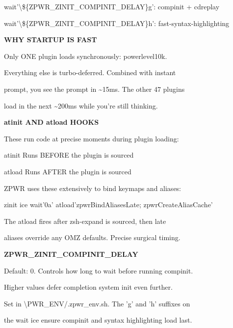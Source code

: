 \documentclass[11pt,a4paper,twoside]{book}
\begin{document}
wait'\textbackslash{}\$\{ZPWR\_ZINIT\_COMPINIT\_DELAY\}g':  compinit + cdreplay

wait'\textbackslash{}\$\{ZPWR\_ZINIT\_COMPINIT\_DELAY\}h':  fast-syntax-highlighting


\vspace{12pt}
{\bfseries\color{neonyellow} WHY STARTUP IS FAST}\vspace{4pt}

Only ONE plugin loads synchronously: powerlevel10k.

Everything else is turbo-deferred. Combined with instant

prompt, you see the prompt in \textasciitilde{}15ms. The other 47 plugins

load in the next \textasciitilde{}200ms while you're still thinking.


\vspace{12pt}
{\bfseries\color{neonyellow} atinit AND atload HOOKS}\vspace{4pt}

These run code at precise moments during plugin loading:

atinit   Runs BEFORE the plugin is sourced

atload   Runs AFTER the plugin is sourced

ZPWR uses these extensively to bind keymaps and aliases:

\begin{codebox}
zinit ice wait'0a' atload'zpwrBindAliasesLate; zpwrCreateAliasCache'\\
\end{codebox}

The atload fires after zsh-expand is sourced, then late

aliases override any OMZ defaults. Precise surgical timing.


\vspace{12pt}
{\bfseries\color{neonyellow} ZPWR\_ZINIT\_COMPINIT\_DELAY}\vspace{4pt}

Default: 0. Controls how long to wait before running compinit.

Higher values defer completion system init even further.

Set in \textbackslash{}PWR\_ENV/.zpwr\_env.sh. The 'g' and 'h' suffixes on

the wait ice ensure compinit and syntax highlighting load last.


\vspace{16pt}
\end{document}
